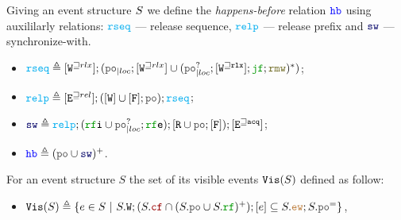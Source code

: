 \documentclass[12pt]{article}
\begin{document}
\begin{definition}
  Giving an event structure $S$ we define the \emph{happens-before} relation $\lHB$
  using auxililarly relations: 
  $\lRSEQ$ --- release sequence,
  $\lRELP$ --- release prefix and
  $\lSW$ --- synchronize-with.
  \begin{itemize}
  \item $\lRSEQ \defeq [\lWsqeq{rlx}];(\lmakeLoc{\lPO};[\lWsqeq{rlx}] \cup 
    (\lmakeLoc{\lPO^?};[\lWsqeq{\rlx}];\lJF;\lRMW)^*)$;
  \item $\lRELP \defeq [\lEsqeq{rel}];([\lW] \cup [\lF];\lPO);\lRSEQ$;
  \item $\lSW \defeq \lRELP; (\lRFI \cup \lmakeLoc{\lPO^?};\lRFE); [\lR \cup \lPO;[\lF]);[\lEsqeq{\acq}]$;
  \item $\lHB \defeq (\lPO \cup \lSW)^+$.
  \end{itemize}
\end{definition}


\begin{definition}
  For an event structure $S$ the set of its visible events ${\mathtt{Vis}}(S)$ defined as follow:
  \begin{itemize}
    \item $\lVIS(S) \defeq 
      \{ e \in S ~|~ S.\lW;(S.\lCF \cap (S.\lPO \cup S.\lRF)^+);[e] \subseteq 
         S.\lEW;S.\lPO^=
      \}$,
  \end{itemize}
\end{definition}
\end{document}
